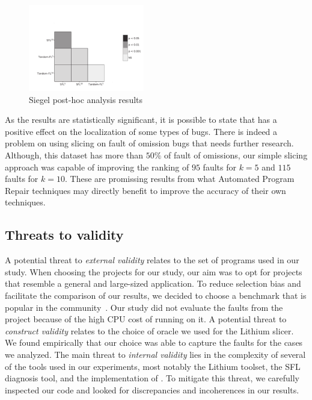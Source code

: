 \documentclass{article}
\begin{document}
\begin{figure}[h]
	\vspace{-1.8cm}
		\includegraphics[width=0.45\textwidth]{figures/heatmap_nemenyi_result.pdf}
		\caption{Siegel post-hoc analysis results}
		\label{fig:performance}
		\vspace{-0.3cm}
\end{figure}

As the results are statistically significant, it is possible to state
that  has a positive effect on the localization of some
types of bugs. There is indeed a problem on using slicing on fault of
omission bugs that needs further research.  Although, this dataset has
more than $50\%$ of fault of omissions, our simple slicing approach
was capable of improving the ranking of $95$ faults for $k=5$ and
$115$ faults for $k=10$. These are promissing results from what Automated
Program Repair techniques may directly benefit to improve the accuracy
of their own techniques.


\subsection{Threats to validity}
%
A potential threat to \textit{external validity} relates to the set of programs used in
our study. When choosing the projects for our study, our aim was to opt for
projects that resemble a general and large-sized application. To reduce
selection bias and facilitate the comparison of our results, we decided to
choose a benchmark that is popular in the community~\cite{just-defects4j-issta2014}.
Our study did not evaluate the faults from the \closure{}
project because of the high CPU cost of running  on it. A potential
threat to \textit{construct validity} relates to the choice of oracle
we used for the Lithium slicer. We found empirically that our choice was able to capture 
the faults for the cases we analyzed.
The main threat to \textit{internal validity} lies in the complexity of several of the tools
used in our experiments, most notably the Lithium toolset, the SFL diagnosis tool,
and the implementation of \comb{}. To mitigate this threat, we
carefully inspected our code and looked for discrepancies and
incoherences in our results.
\end{document}
